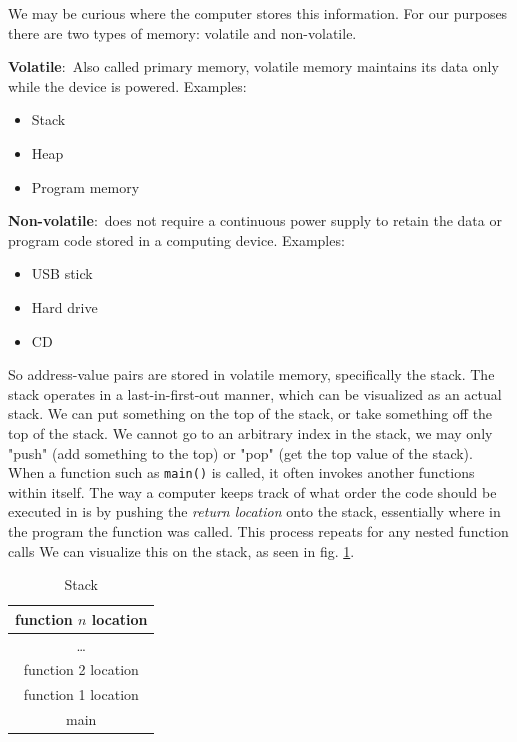 \documentclass[nobib]{tufte-handout}
\newcommand{\defn}[2]{\noindent\textbf{#1}:\ #2}
\begin{document}
We may be curious where the computer stores this information.
For our purposes there are two types of memory: volatile and non-volatile.

\defn{Volatile}{Also called primary memory, volatile memory
maintains its data only while the device is powered.} Examples:
\begin{itemize}
   \item Stack
   \item Heap
   \item Program memory
\end{itemize} 

\defn{Non-volatile}{does not require a continuous power 
supply to retain the data or program code stored in a computing device.} Examples:
\begin{itemize}
   \item USB stick
   \item Hard drive 
   \item CD
\end{itemize}
So address-value pairs are stored in volatile memory, specifically the stack. 
The stack operates in a last-in-first-out manner, which can be visualized as
an actual stack. We can put something on the top of the stack, or take something off
the top of the stack. We cannot go to an arbitrary index in the stack, we may 
only "push" (add something to the top) or "pop" (get the top value of the stack).
When a function such as \texttt{main()} is called, it often invokes another functions
within itself. The way a computer keeps track of what order the code should be 
executed in is by pushing the \emph{return location} onto the stack, essentially
where in the program the function was called. This process 
repeats for any nested function calls We can visualize this on the stack, as
seen in fig. \ref{table:stackfunctionlocation}. 
\begin{table}[h]
   \centering
   \caption{Stack}
   \label{table:stackfunctionlocation}
   \begin{tabular}{|c|}
   \hline
   function $n$ location\\
   \hline
   \dots\\
   \hline
   function 2 location\\
   \hline
   function 1 location\\
   \hline
   main \\
   \hline
   \end{tabular}
\end{table}
\end{document}
